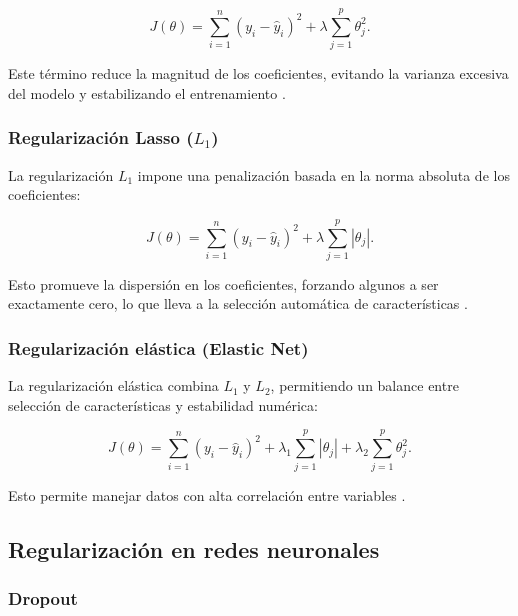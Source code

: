 \begin{itemize}
		\begin{equation}
			J(\theta) = \sum_{i=1}^{n} (y_i - \hat{y}_i)^2 + \lambda \sum_{j=1}^{p} \theta_j^2.
		\end{equation}
		
		Este término reduce la magnitud de los coeficientes, evitando la varianza excesiva del modelo y estabilizando el entrenamiento \cite{hoerl1970ridge}.
		
		\subsubsection{Regularización Lasso (\( L_1 \))}
		
		La regularización \( L_1 \) impone una penalización basada en la norma absoluta de los coeficientes:
		
		\begin{equation}
			J(\theta) = \sum_{i=1}^{n} (y_i - \hat{y}_i)^2 + \lambda \sum_{j=1}^{p} |\theta_j|.
		\end{equation}
		
		Esto promueve la dispersión en los coeficientes, forzando algunos a ser exactamente cero, lo que lleva a la selección automática de características \cite{tibshirani1996lasso}.
		
		\subsubsection{Regularización elástica (Elastic Net)}
		
		La regularización elástica combina \( L_1 \) y \( L_2 \), permitiendo un balance entre selección de características y estabilidad numérica:
		
		\begin{equation}
			J(\theta) = \sum_{i=1}^{n} (y_i - \hat{y}_i)^2 + \lambda_1 \sum_{j=1}^{p} |\theta_j| + \lambda_2 \sum_{j=1}^{p} \theta_j^2.
		\end{equation}
		
		Esto permite manejar datos con alta correlación entre variables \cite{zou2005regularization}.
		
		\subsection{Regularización en redes neuronales}
		
		\subsubsection{Dropout}
		

\end{itemize}
